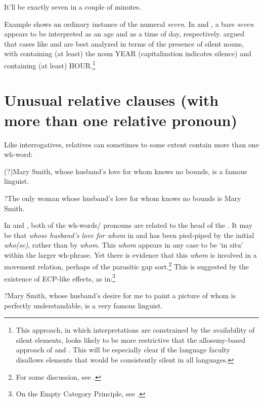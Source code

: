 \documentclass[output=paper]{LSP/langsci}
\begin{document}
\ea\label{ex:kayne:5}
   It’ll be exactly seven in a couple of minutes.
\z

Example  shows an ordinary instance of the numeral \textit{seven}.  In  and , a bare \textit{seven} appears to be interpreted as an age and as a time of day, respectively.  \citet{Kayne2003} argued that cases like  and  are best analyzed in terms of the presence of silent nouns, with  containing (at least) the noun YEAR (capitalization indicates silence) and  containing (at least) HOUR.\footnote{This approach, in which interpretations are constrained by the availability of silent elements, looks likely to be more restrictive that the allosemy-based approach of \citet{Marantz2010} and \citet{WoodMarantztoappear}.  This will be especially clear if the language faculty disallows elements that would be consistently silent in all languages.}

\section{Unusual relative clauses (with more than one relative pronoun)}

     Like interrogatives, relatives can sometimes to some extent contain more than one wh-word:

\ea\label{ex:kayne:6}
   (?)Mary Smith, whose husband’s love for whom knows no bounds, is a famous linguist.
\z

\ea\label{ex:kayne:7}
   ?The only woman whose husband’s love for whom knows no bounds is Mary Smith.
\z

In  and , both of the wh-words/ pronouns are related to the head of the . It may be that \textit{whose husband’s love for whom} in  and  has been pied-piped by the initial \textit{who(se)}, rather than by \textit{whom}.  This \textit{whom} appears in any case to be ‘in situ’ within the larger wh-phrase.  Yet there is evidence that this \textit{whom} is involved in a movement relation, perhaps of the parasitic gap sort.\footnote{For some discussion, see \citet[239ff]{Kayne1983}.}  This is suggested by the existence of ECP-like effects, as in:\footnote{On the Empty Category Principle, see \citet{Chomsky1981}.}

\ea\label{ex:kayne:8}
   ?Mary Smith, whose husband’s desire for me to paint a picture of whom is perfectly understandable, is a very famous linguist.
\z
\end{document}
